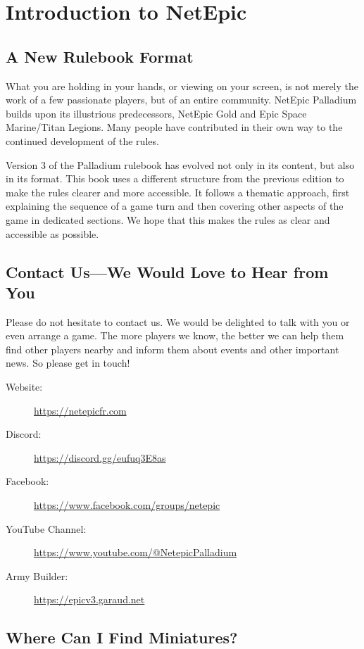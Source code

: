 \onecolumn
\section{Introduction to NetEpic}

\subsection{A New Rulebook Format}

What you are holding in your hands, or viewing on your screen, is not merely the work of a few passionate players, but of an entire community. NetEpic Palladium builds upon its illustrious predecessors, NetEpic Gold and Epic Space Marine/Titan Legions. Many people have contributed in their own way to the continued development of the rules.

Version 3 of the Palladium rulebook has evolved not only in its content, but also in its format. This book uses a different structure from the previous edition to make the rules clearer and more accessible. It follows a thematic approach, first explaining the sequence of a game turn and then covering other aspects of the game in dedicated sections. We hope that this makes the rules as clear and accessible as possible.

\subsection{Contact Us---We Would Love to Hear from You}

Please do not hesitate to contact us. We would be delighted to talk with you or even arrange a game. The more players we know, the better we can help them find other players nearby and inform them about events and other important news. So please get in touch!

\begin{description}
    \item[Website:] \url{https://netepicfr.com}
    \item[Discord:] \url{https://discord.gg/eufuq3E8as}
    \item[Facebook:] \url{https://www.facebook.com/groups/netepic}
    \item[YouTube Channel:] \url{https://www.youtube.com/@NetepicPalladium}
    \item[Army Builder:] \url{https://epicv3.garaud.net}
\end{description}

\subsection{Where Can I Find Miniatures?}

